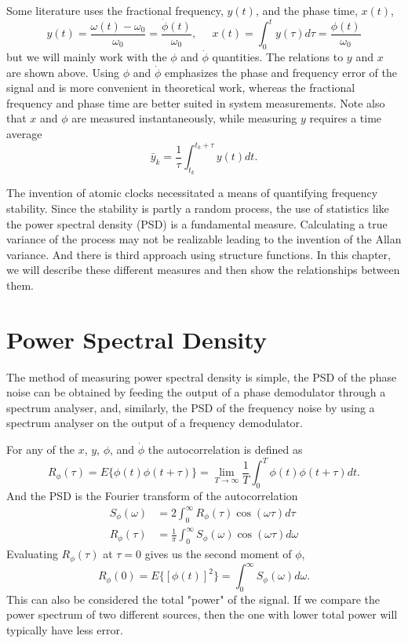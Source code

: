Some literature uses the fractional frequency, $y(t)$, and the phase time, $x(t)$,
%
\begin{equation*}
y(t) = \frac{\omega(t) - \omega_0}{\omega_0} = \frac{\dot{\phi}(t)}{\omega_0}, \;\;\;\;\; x(t) = \int_0^t y(\tau)d\tau = \frac{\phi(t)}{\omega_0}
\end{equation*}
%
but we will mainly work with the $\phi$ and $\dot{\phi}$ quantities. The relations to $y$ and $x$ are shown above. Using $\phi$ and $\dot{\phi}$ emphasizes the phase and frequency error of the signal and is more convenient in theoretical work, whereas the fractional frequency and phase time are better suited in system measurements. Note also that $x$ and $\phi$ are measured instantaneously, while measuring $y$ requires a time average
%
\begin{equation} \label{eq:avgy}
\bar{y}_k = \frac{1}{\tau}\int_{t_k}^{t_k+\tau} y(t)dt.
\end{equation}

The invention of atomic clocks necessitated a means of quantifying frequency stability. Since the stability is partly a random process, the use of statistics like the power spectral density (PSD) is a fundamental measure. Calculating a true variance of the process may not be realizable leading to the invention of the Allan variance. And there is third approach using structure functions. In this chapter, we will describe these different measures and then show the relationships between them.

\section{Power Spectral Density} \label{sec:psd}

The method of measuring power spectral density is simple, the PSD of the phase noise can be obtained by feeding the output of a phase demodulator through a spectrum analyser, and, similarly, the PSD of the frequency noise by using a spectrum analyser on the output of a frequency demodulator.

For any of the $x$, $y$, $\phi$, and $\dot{\phi}$ the autocorrelation is defined as
%
\begin{equation}
R_\phi(\tau) = E\{\phi(t)\phi(t+\tau)\} = \lim\limits_{T\to\infty}\frac{1}{T}\int_{0}^{T} \phi(t)\phi(t+\tau)dt.
\end{equation}
%
And the PSD is the Fourier transform of the autocorrelation
%
\begin{align}
S_\phi(\omega) &= 2\int_0^\infty R_\phi(\tau)\cos(\omega\tau)d\tau \\
R_\phi(\tau) &= \frac{1}{\pi}\int_0^\infty S_\phi(\omega)\cos(\omega\tau)d\omega
\end{align}
%
Evaluating $R_\phi(\tau)$ at $\tau = 0$ gives us the second moment of $\phi$, 
%
\begin{equation*}
R_\phi(0) = E\{[\phi(t)]^2\} = \int_0^\infty S_\phi(\omega) d\omega .
\end{equation*}
%
This can also be considered the total "power" of the signal. If we compare the power spectrum of two different sources, then the one with lower total power will typically have less error.

